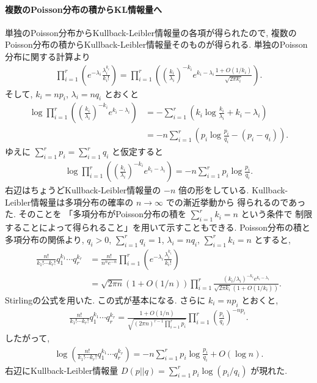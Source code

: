 \documentclass[12pt,twoside]{jarticle}
\theoremstyle{jplain}
\theoremstyle{jplain}
\theoremstyle{jplain}
\numberwithin{theorem}{section}
\numberwithin{equation}{section}
\numberwithin{figure}{section}
\numberwithin{table}{section}
\begin{document}
\paragraph{複数のPoisson分布の積からKL情報量へ}
単独のPoisson分布からKullback-Leibler情報量の各項が得られたので,
複数のPoisson分布の積からKullback-Leibler情報量そのものが得られる.
単独のPoisson分布に関する計算より
\begin{align*}
\prod_{i=1}^r\left(e^{-\lambda_i}\frac{\lambda_i^{k_i}}{k_i!}\right)
=\prod_{i=1}^r
\left(
\left(\frac{k_i}{\lambda_i}\right)^{-k_i}e^{k_i-\lambda_i}\frac{1+O(1/k_i)}{\sqrt{2\pi k_i}}
\right).
\end{align*}
そして, $k_i=np_i$, $\lambda_i=nq_i$ とおくと
\begin{align*}
\log\prod_{i=1}^r
\left(
\left(\frac{k_i}{\lambda_i}\right)^{-k_i}e^{k_i-\lambda_i}
\right)
&=-\sum_{i=1}^r\left(k_i\log\frac{k_i}{\lambda_i}+k_i-\lambda_i\right)
\\ &
=-n\sum_{i=1}^r\left(p_i\log\frac{p_i}{q_i}-(p_i-q_i)\right).
\end{align*}
ゆえに $\sum_{i=1}^r p_i=\sum_{i=1}^r q_i$ と仮定すると
\begin{align*}
\log\prod_{i=1}^r
\left(
\left(\frac{k_i}{\lambda_i}\right)^{-k_i}e^{k_i-\lambda_i}
\right)
=-n\sum_{i=1}^r p_i\log\frac{p_i}{q_i}.
\end{align*}
右辺はちょうどKullback-Leibler情報量の $-n$ 倍の形をしている.
Kullback-Leibler情報量は多項分布の確率の $n\to\infty$ での漸近挙動から
得られるのであった. そのことを
「多項分布がPoisson分布の積を $\sum_{i=1}^r k_i=n$ という条件で
制限することによって得られること」を用いて示すこともできる.
Poisson分布の積と多項分布の関係より,
$q_i>0$, $\sum_{i=1}^r q_i=1$, $\lambda_i=nq_i$, $\sum_{i=1}^r k_i=n$ とすると,
\begin{align*}
\frac{n!}{k_1!\cdots k_r!} q_1^{k_1}\cdots q_r^{k_r}
&=\frac{n!}{n^n e^{-n}}
\prod_{i=1}^r \left( e^{-\lambda_i}\frac{\lambda_i^{k_i}}{k_i!} \right)
\\ &
=
\sqrt{2\pi n}(1+O(1/n))
\prod_{i=1}^r \frac{(k_i/\lambda_i)^{-k_i} e^{k_i-\lambda_i}}{\sqrt{2\pi k_i}(1+O(1/k_i))}.
\end{align*}
Stirlingの公式を用いた. この式が基本になる.
さらに $k_i=np_i$ とおくと,
\begin{align*}
\frac{n!}{k_1!\cdots k_r!} q_1^{k_1}\cdots q_r^{k_r}
=\frac{1+O(1/n)}{\sqrt{(2\pi n)^{r-1}\prod_{i=1}^r p_i}}
\prod_{i=1}^r\left(\frac{p_i}{q_i}\right)^{-np_i}.
\end{align*}
したがって,
\begin{align*}
\log\left(\frac{n!}{k_1!\cdots k_r!} q_1^{k_1}\cdots q_r^{k_r}\right)
=-n\sum_{i=1}^r p_i\log\frac{p_i}{q_i} + O(\log n).
\end{align*}
右辺にKullback-Leibler情報量 $D(p||q)=\sum_{i=1}^r p_i\log(p_i/q_i)$ が現れた.
\end{document}
